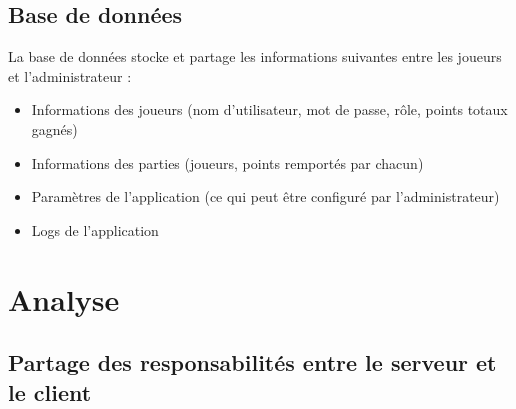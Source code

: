 \documentclass[a4paper,11pt]{article}
\begin{document}
	
	\subsection{Base de données}
	La base de données stocke et partage les informations suivantes entre les joueurs et l'administrateur :
	\begin{itemize}
		\item Informations des joueurs (nom d'utilisateur, mot de passe, rôle, points totaux gagnés)
		\item Informations des parties (joueurs, points remportés par chacun)
		\item Paramètres de l'application (ce qui peut être configuré par l'administrateur)
		\item Logs de l'application
	\end{itemize}
	
	
	\section{Analyse}
	
	
	\subsection{Partage des responsabilités entre le serveur et le client}
\end{document}
